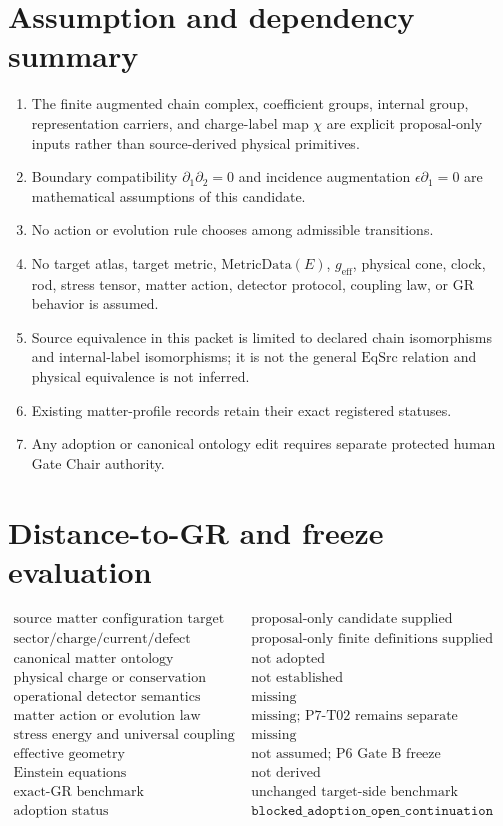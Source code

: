 \documentclass[11pt]{article}
\newcommand{\MetricData}{\mathrm{MetricData}}
\newcommand{\geff}{g_{\mathrm{eff}}}
\begin{document}
\section{Assumption and dependency summary}

\begin{enumerate}[leftmargin=*]
\item The finite augmented chain complex, coefficient groups, internal group,
  representation carriers, and charge-label map \(\chi\) are explicit
  proposal-only inputs rather than source-derived physical primitives.
\item Boundary compatibility
  \(\partial_1\partial_2=0\) and incidence augmentation
  \(\epsilon\partial_1=0\) are mathematical assumptions of this candidate.
\item No action or evolution rule chooses among admissible transitions.
\item No target atlas, target metric, \(\MetricData(E)\), \(\geff\), physical
  cone, clock, rod, stress tensor, matter action, detector protocol, coupling
  law, or GR behavior is assumed.
\item Source equivalence in this packet is limited to declared chain
  isomorphisms and internal-label isomorphisms; it is not the general
  \(\mathrm{EqSrc}\) relation and physical equivalence is not inferred.
\item Existing matter-profile records retain their exact registered statuses.
\item Any adoption or canonical ontology edit requires separate protected
  human Gate Chair authority.
\end{enumerate}

\section{Distance-to-GR and freeze evaluation}

\[
\begin{array}{ll}
\text{source matter configuration target}
  & \text{proposal-only candidate supplied}\\
\text{sector/charge/current/defect taxonomy}
  & \text{proposal-only finite definitions supplied}\\
\text{canonical matter ontology}
  & \text{not adopted}\\
\text{physical charge or conservation}
  & \text{not established}\\
\text{operational detector semantics}
  & \text{missing}\\
\text{matter action or evolution law}
  & \text{missing; P7-T02 remains separate}\\
\text{stress energy and universal coupling}
  & \text{missing}\\
\text{effective geometry}
  & \text{not assumed; P6 Gate B freeze unchanged}\\
\text{Einstein equations}
  & \text{not derived}\\
\text{exact-GR benchmark}
  & \text{unchanged target-side benchmark}\\
\text{adoption status}
  & \texttt{blocked\_adoption\_open\_continuation}
\end{array}
\]
\end{document}
